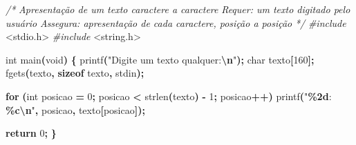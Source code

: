 \documentclass[
  11pt,
  a4paper,
]{scrbook}
\newenvironment{Shaded}{\begin{snugshade}}{\end{snugshade}}
\newcommand{\CommentTok}[1]{\textcolor[rgb]{0.56,0.35,0.01}{\textit{#1}}}
\newcommand{\ControlFlowTok}[1]{\textcolor[rgb]{0.13,0.29,0.53}{\textbf{#1}}}
\newcommand{\DataTypeTok}[1]{\textcolor[rgb]{0.13,0.29,0.53}{#1}}
\newcommand{\DecValTok}[1]{\textcolor[rgb]{0.00,0.00,0.81}{#1}}
\newcommand{\ImportTok}[1]{#1}
\newcommand{\KeywordTok}[1]{\textcolor[rgb]{0.13,0.29,0.53}{\textbf{#1}}}
\newcommand{\NormalTok}[1]{#1}
\newcommand{\OperatorTok}[1]{\textcolor[rgb]{0.81,0.36,0.00}{\textbf{#1}}}
\newcommand{\PreprocessorTok}[1]{\textcolor[rgb]{0.56,0.35,0.01}{\textit{#1}}}
\newcommand{\SpecialCharTok}[1]{\textcolor[rgb]{0.81,0.36,0.00}{\textbf{#1}}}
\newcommand{\StringTok}[1]{\textcolor[rgb]{0.31,0.60,0.02}{#1}}
\begin{document}
\begin{Shaded}
\begin{Highlighting}[]
\CommentTok{/*}
\CommentTok{Apresentação de um texto caractere a caractere}
\CommentTok{Requer: um texto digitado pelo usuário}
\CommentTok{Assegura: apresentação de cada caractere, posição a posição}
\CommentTok{*/}
\PreprocessorTok{\#include }\ImportTok{\textless{}stdio.h\textgreater{}}
\PreprocessorTok{\#include }\ImportTok{\textless{}string.h\textgreater{}}

\DataTypeTok{int}\NormalTok{ main}\OperatorTok{(}\DataTypeTok{void}\OperatorTok{)} \OperatorTok{\{}
\NormalTok{    printf}\OperatorTok{(}\StringTok{"Digite um texto qualquer:}\SpecialCharTok{\textbackslash{}n}\StringTok{"}\OperatorTok{);}
    \DataTypeTok{char}\NormalTok{ texto}\OperatorTok{[}\DecValTok{160}\OperatorTok{];}
\NormalTok{    fgets}\OperatorTok{(}\NormalTok{texto}\OperatorTok{,} \KeywordTok{sizeof}\NormalTok{ texto}\OperatorTok{,}\NormalTok{ stdin}\OperatorTok{);}

    \ControlFlowTok{for} \OperatorTok{(}\DataTypeTok{int}\NormalTok{ posicao }\OperatorTok{=} \DecValTok{0}\OperatorTok{;}\NormalTok{ posicao }\OperatorTok{\textless{}}\NormalTok{ strlen}\OperatorTok{(}\NormalTok{texto}\OperatorTok{)} \OperatorTok{{-}} \DecValTok{1}\OperatorTok{;}\NormalTok{ posicao}\OperatorTok{++)}
\NormalTok{        printf}\OperatorTok{(}\StringTok{"}\SpecialCharTok{\%2d}\StringTok{: \textquotesingle{}}\SpecialCharTok{\%c}\StringTok{\textquotesingle{}}\SpecialCharTok{\textbackslash{}n}\StringTok{"}\OperatorTok{,}\NormalTok{ posicao}\OperatorTok{,}\NormalTok{ texto}\OperatorTok{[}\NormalTok{posicao}\OperatorTok{]);}

    \ControlFlowTok{return} \DecValTok{0}\OperatorTok{;}
\OperatorTok{\}}
\end{Highlighting}
\end{Shaded}
\end{document}
